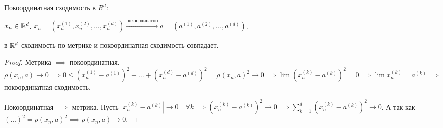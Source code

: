 \begin{definition}
    Покоординатная сходимость в $R^d$:

    $x_n \in \mathbb{R}^d$.  $x_n = (x_n^{(1)}, x_n^{(2)}, \ldots, x_n^{(d)}) \xrightarrow{\text{покоординатно}} a = (a^{(1)}, a^{(2)}, \ldots, a^{(d)})$.
\end{definition}
\begin{theorem}
    в $\mathbb{R}^d$ сходимость по метрике и покоординатная сходимость совпадает.
\end{theorem}
\begin{proof}
    Метрика $\implies$ покоординатная.  $\rho(x_n, a) \to 0 \implies 0 \le (x_n^{(1)} - a^{(1)})^2 + \ldots + (x_n^{(d)} - a^{(d)})^2 = \rho(x_n, a)^2 \to 0 \implies \lim (x_n^{(k)} - a^{(k)})^2 = 0 \implies \lim x_n^{(k)} = a^{(k)} \implies$ покоординатная сходимость.

    Покоординатная $\implies$ метрика. Пусть  $|x_n^{(k)} - a^{(k)}| \to 0 \quad \forall k \implies (x_n^{(k)} - a^{(k)})^2 \to 0 \implies \sum\limits_{k=1}^d (x_n^{(k)} - a^{(k)})^2 \to 0$. А так как $(\ldots)^2 = \rho(x_n, a)^2 \implies \rho(x_n, a) \to 0$.
\end{proof}

